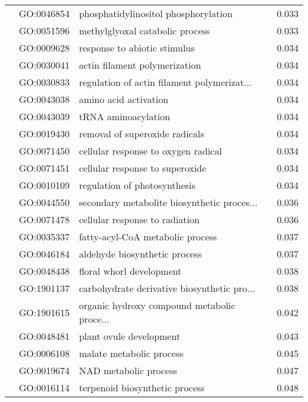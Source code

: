 \begin{longtable}{lllr}
   & GO:0046854 &         phosphatidylinositol phosphorylation &         0.033 \\
   & GO:0051596 &              methylglyoxal catabolic process &         0.033 \\
   & GO:0009628 &                 response to abiotic stimulus &         0.034 \\
   & GO:0030041 &                actin filament polymerization &         0.034 \\
   & GO:0030833 &  regulation of actin filament polymerizat... &         0.034 \\
   & GO:0043038 &                        amino acid activation &         0.034 \\
   & GO:0043039 &                          tRNA aminoacylation &         0.034 \\
   & GO:0019430 &               removal of superoxide radicals &         0.034 \\
   & GO:0071450 &          cellular response to oxygen radical &         0.034 \\
   & GO:0071451 &              cellular response to superoxide &         0.034 \\
   & GO:0010109 &                 regulation of photosynthesis &         0.034 \\
   & GO:0044550 &  secondary metabolite biosynthetic proces... &         0.036 \\
   & GO:0071478 &               cellular response to radiation &         0.036 \\
   & GO:0035337 &             fatty-acyl-CoA metabolic process &         0.037 \\
   & GO:0046184 &                aldehyde biosynthetic process &         0.037 \\
   & GO:0048438 &                     floral whorl development &         0.038 \\
   & GO:1901137 &  carbohydrate derivative biosynthetic pro... &         0.038 \\
   & GO:1901615 &  organic hydroxy compound metabolic proce... &         0.042 \\
   & GO:0048481 &                      plant ovule development &         0.043 \\
   & GO:0006108 &                     malate metabolic process &         0.045 \\
   & GO:0019674 &                        NAD metabolic process &         0.047 \\
   & GO:0016114 &               terpenoid biosynthetic process &         0.048 \\

\end{longtable}
